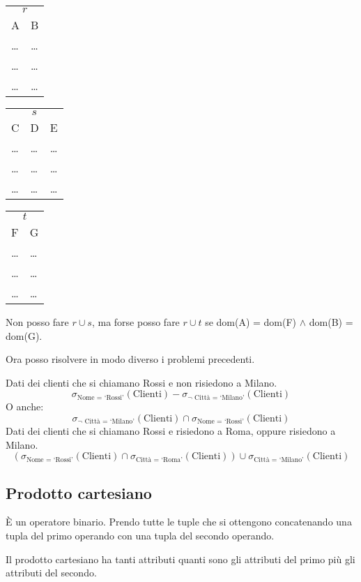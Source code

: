 \begin{center}
\begin{tabular}{ll}
\multicolumn{2}{c}{$r$} \\
A & B \\
\hline
\dots & \dots \\
\dots & \dots \\
\dots & \dots 
\end{tabular}
\quad
\begin{tabular}{lll}
\multicolumn{3}{c}{$s$} \\
C & D & E \\
\hline
\dots & \dots & \dots \\
\dots & \dots & \dots \\
\dots & \dots & \dots
\end{tabular}
\quad
\begin{tabular}{ll}
\multicolumn{2}{c}{$t$} \\
F & G \\
\hline
\dots & \dots \\
\dots & \dots \\
\dots & \dots 
\end{tabular}
\end{center}

Non posso fare $r \cup s$, ma forse posso fare $r \cup t$ se dom(A) = dom(F) $\land$ dom(B) = dom(G).

Ora posso risolvere in modo diverso i problemi precedenti.

Dati dei clienti che si chiamano Rossi e non risiedono a Milano.
\[
\sigma_{\text{Nome = `Rossi'}}(\text{Clienti})
-
\sigma_{\neg \text{ Citt\`a = `Milano'}}(\text{Clienti})
\]
O anche:
\[
\sigma_{\neg \text{ Citt\`a = `Milano'}}(\text{Clienti})
\cap
\sigma_{\text{Nome = `Rossi'}}(\text{Clienti})
\]
Dati dei clienti che si chiamano Rossi e risiedono a Roma, oppure risiedono a Milano.
\[
\left(
\sigma_{\text{Nome = `Rossi'}}(\text{Clienti})
\cap
\sigma_{\text{Citt\`a = `Roma'}}(\text{Clienti})
\right)
\cup
\sigma_{\text{Citt\`a = `Milano'}}(\text{Clienti})
\]

\subsection{Prodotto cartesiano}

\`E un operatore binario. Prendo tutte le tuple che si ottengono concatenando una tupla del primo operando con una tupla del secondo operando.

Il prodotto cartesiano ha tanti attributi quanti sono gli attributi del primo pi\`u gli attributi del secondo.

